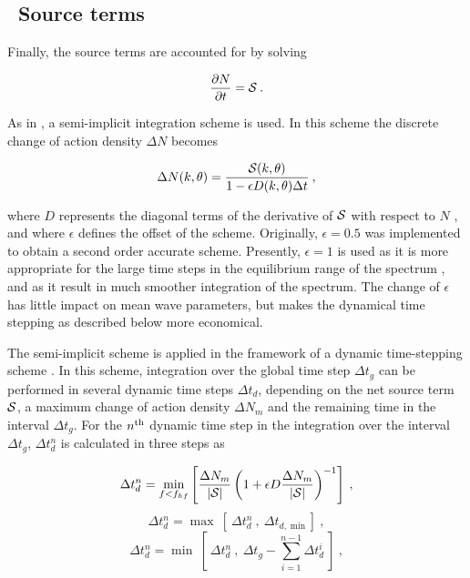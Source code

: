 \subsection{~Source terms} \label{sub:source}
\vssub

Finally, the source terms are accounted for by solving


\begin{equation}
\frac{\partial N}{\partial t} = {\cal S} \: . \label{eq:step_source}
\end{equation}

\noindent 
As in \wam, a semi-implicit integration scheme is used. In this scheme the
discrete change of action density $\Delta N$ becomes \citep{art:WAM88}


\begin{equation}
\Delta N(k,\theta) = \frac{{\cal S}(k,\theta)}{1- \epsilon D(k,\theta)\Delta t}
\: , \label{eq:implicit_st} \end{equation}

\noindent 
where $D$ represents the diagonal terms of the derivative of ${\cal S}$ with
respect to $N$ \citep[Eqs. 4.1 through 4.10]{art:WAM88}, and where $\epsilon$
defines the offset of the scheme. Originally, $\epsilon = 0.5$ was implemented
to obtain a second order accurate scheme. Presently, $\epsilon = 1$ is used as
it is more appropriate for the large time steps in the equilibrium range of
the spectrum \citep{pro:HA98,art:HA01}, and as it result in much smoother
integration of the spectrum. The change of $\epsilon$ has little impact on
mean wave parameters, but makes the dynamical time stepping as described below
more economical.

The semi-implicit scheme is applied in the framework of a dynamic
time-stepping scheme \citep{tol:JPO92}. In this scheme, integration over the
global time step $\Delta t_g$ can be performed in several dynamic time steps
$\Delta t_d$, depending on the net source term ${\cal S}$, a maximum change of
action density $\Delta N_m$ and the remaining time in the interval $\Delta
t_g$. For the $n^{\rm th}$ dynamic time step in the integration over the
interval $\Delta t_g$, $\Delta t_d^n$ is calculated in three steps as


\begin{equation}
\Delta t_d^n = 
\min_{f<f_{hf}} \left [ \frac{\Delta N_m}{|{\cal S}|}
\left ( 1 + \epsilon D \frac{\Delta N_m}{|{\cal S}|} \right ) ^{-1}
\right ] \: , \label{eq:st_d_1}
\end{equation} \begin{equation}
\Delta t_d^n = \max \: \left [ \: \Delta t_d^n \: , \: 
\Delta t_{d,\min} \right ] \: , \label{eq:st_d_2a}
\end{equation} \begin{equation}
\Delta t_d^n = \min \: \left [ \: \Delta t_d^n \: , \: 
\Delta t_g - \sum_{i=1}^{n-1} \Delta t_d^i
 \: \right ] \: , \label{eq:st_d_2b}
\end{equation}

